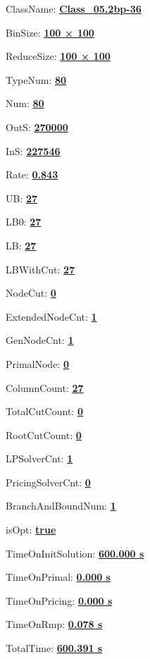 \documentclass[11pt]{article}
\begin{document}
\pagestyle{empty}


ClassName: \underline{\textbf{Class_05.2bp-36}}
\par
BinSize: \underline{\textbf{100 × 100}}
\par
ReduceSize: \underline{\textbf{100 × 100}}
\par
TypeNum: \underline{\textbf{80}}
\par
Num: \underline{\textbf{80}}
\par
OutS: \underline{\textbf{270000}}
\par
InS: \underline{\textbf{227546}}
\par
Rate: \underline{\textbf{0.843}}
\par
UB: \underline{\textbf{27}}
\par
LB0: \underline{\textbf{27}}
\par
LB: \underline{\textbf{27}}
\par
LBWithCut: \underline{\textbf{27}}
\par
NodeCut: \underline{\textbf{0}}
\par
ExtendedNodeCnt: \underline{\textbf{1}}
\par
GenNodeCnt: \underline{\textbf{1}}
\par
PrimalNode: \underline{\textbf{0}}
\par
ColumnCount: \underline{\textbf{27}}
\par
TotalCutCount: \underline{\textbf{0}}
\par
RootCutCount: \underline{\textbf{0}}
\par
LPSolverCnt: \underline{\textbf{1}}
\par
PricingSolverCnt: \underline{\textbf{0}}
\par
BranchAndBoundNum: \underline{\textbf{1}}
\par
isOpt: \underline{\textbf{true}}
\par
TimeOnInitSolution: \underline{\textbf{600.000 s}}
\par
TimeOnPrimal: \underline{\textbf{0.000 s}}
\par
TimeOnPricing: \underline{\textbf{0.000 s}}
\par
TimeOnRmp: \underline{\textbf{0.078 s}}
\par
TotalTime: \underline{\textbf{600.391 s}}
\par
\newpage


\end{document}
